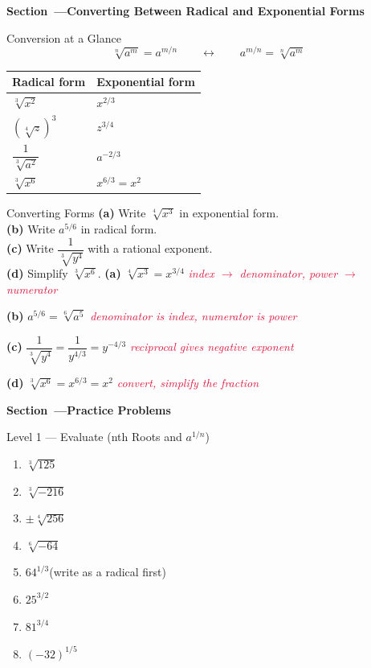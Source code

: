 \documentclass[12pt]{article}
\newcounter{mysec}
\newcommand{\mysection}[1]{%
  \stepcounter{mysec}%
  \vspace{14pt}%
  \noindent
  \begin{tcolorbox}[enhanced,colback=navy,colframe=navy,
    boxrule=0pt,arc=3pt,left=8pt,right=8pt,top=5pt,bottom=5pt,
    before skip=0pt,after skip=10pt]
    \color{white}\bfseries\large Section~\themysec\enspace---\enspace #1
  \end{tcolorbox}}
\newcommand{\step}[1]{\hfill\textcolor{crimson}{\small\textit{#1}}}
\begin{document}
\mysection{Converting Between Radical and Exponential Forms}

\begin{conceptbox}{Conversion at a Glance}
\[
  \sqrt[n]{a^m} = a^{m/n}
  \qquad\longleftrightarrow\qquad
  a^{m/n} = \sqrt[n]{a^m}
\]
\begin{center}
\renewcommand{\arraystretch}{1.4}
\begin{tabular}{@{}ll@{}}
\toprule
Radical form & Exponential form \\
\midrule
$\sqrt[3]{x^2}$ & $x^{2/3}$ \\
$(\sqrt[4]{z})^3$ & $z^{3/4}$ \\
$\dfrac{1}{\sqrt[3]{a^2}}$ & $a^{-2/3}$ \\
$\sqrt[3]{x^6}$ & $x^{6/3}=x^2$ \\
\bottomrule
\end{tabular}
\end{center}
\end{conceptbox}

\begin{examplebox}{Converting Forms}
\textbf{(a)} Write $\sqrt[4]{x^3}$ in exponential form.\\
\textbf{(b)} Write $a^{5/6}$ in radical form.\\
\textbf{(c)} Write $\dfrac{1}{\sqrt[3]{y^4}}$ with a rational exponent.\\
\textbf{(d)} Simplify $\sqrt[3]{x^6}$.
\tcblower
\textbf{(a)} $\sqrt[4]{x^3}=x^{3/4}$ \step{index $\to$ denominator, power $\to$ numerator}

\medskip
\textbf{(b)} $a^{5/6}=\sqrt[6]{a^5}$ \step{denominator is index, numerator is power}

\medskip
\textbf{(c)} $\dfrac{1}{\sqrt[3]{y^4}}=\dfrac{1}{y^{4/3}}=y^{-4/3}$ \step{reciprocal gives negative exponent}

\medskip
\textbf{(d)} $\sqrt[3]{x^6}=x^{6/3}=x^2$ \step{convert, simplify the fraction}
\end{examplebox}

\mysection{Practice Problems}

\begin{practicebox}{Level 1 --- Evaluate (nth Roots and $a^{1/n}$)}
\begin{enumerate}[label=\textbf{\arabic*.},leftmargin=*,itemsep=8pt]
  \item $\sqrt[3]{125}$
  \item $\sqrt[3]{-216}$
  \item $\pm\sqrt[4]{256}$
  \item $\sqrt[6]{-64}$
  \item $64^{1/3}$\quad (write as a radical first)
  \item $25^{3/2}$
  \item $81^{3/4}$
  \item $(-32)^{1/5}$
\end{enumerate}
\end{practicebox}
\end{document}
